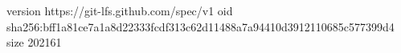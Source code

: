 version https://git-lfs.github.com/spec/v1
oid sha256:bff1a81ce7a1a8d22333fcdf313c62d11488a7a94410d3912110685c577399d4
size 202161
